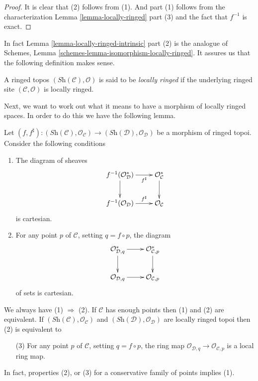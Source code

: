 \begin{proof}
It is clear that (2) follows from (1).
And part (1) follows from the characterization
Lemma \ref{lemma-locally-ringed} part (3)
and the fact that $f^{-1}$ is exact.
\end{proof}

\noindent
In fact
Lemma \ref{lemma-locally-ringed-intrinsic} part (2)
is the analogue of
Schemes, Lemma \ref{schemes-lemma-isomorphism-locally-ringed}.
It assures us that the following definition makes sense.

\begin{definition}
\label{definition-locally-ringed-topos}
A ringed topos $(\textit{Sh}(\mathcal{C}), \mathcal{O})$ is said to be
{\it locally ringed} if the underlying ringed site
$(\mathcal{C}, \mathcal{O})$ is locally ringed.
\end{definition}

\noindent
Next, we want to work out what it means to have a morphism of locally ringed
spaces. In order to do this we have the following lemma.

\begin{lemma}
\label{lemma-locally-ringed-morphism}
Let
$(f, f^\sharp) : (\textit{Sh}(\mathcal{C}), \mathcal{O}_{\mathcal{C}})
\to (\textit{Sh}(\mathcal{D}), \mathcal{O}_{\mathcal{D}})$
be a morphism of ringed topoi.
Consider the following conditions
\begin{enumerate}
\item The diagram of sheaves
$$
\xymatrix{
f^{-1}(\mathcal{O}^*_{\mathcal{D}}) \ar[r]_-{f^\sharp} \ar[d] &
\mathcal{O}^*_{\mathcal{C}} \ar[d] \\
f^{-1}(\mathcal{O}_{\mathcal{D}}) \ar[r]^-{f^\sharp} &
\mathcal{O}_{\mathcal{C}}
}
$$
is cartesian.
\item For any point $p$ of $\mathcal{C}$, setting $q = f \circ p$,
the diagram
$$
\xymatrix{
\mathcal{O}^*_{\mathcal{D}, q} \ar[r] \ar[d] &
\mathcal{O}^*_{\mathcal{C}, p} \ar[d] \\
\mathcal{O}_{\mathcal{D}, q} \ar[r] &
\mathcal{O}_{\mathcal{C}, p}
}
$$
of sets is cartesian.
\end{enumerate}
We always have (1) $\Rightarrow$ (2). If $\mathcal{C}$ has enough points
then (1) and (2) are equivalent. If
$(\textit{Sh}(\mathcal{C}), \mathcal{O}_{\mathcal{C}})$
and
$(\textit{Sh}(\mathcal{D}), \mathcal{O}_{\mathcal{D}})$
are locally ringed topoi then (2) is equivalent to
\begin{enumerate}
\item[(3)] For any point $p$ of $\mathcal{C}$, setting $q = f \circ p$,
the ring map $\mathcal{O}_{\mathcal{D}, q} \to \mathcal{O}_{\mathcal{C}, p}$
is a local ring map.
\end{enumerate}
In fact, properties (2), or (3) for a conservative
family of points implies (1).
\end{lemma}

